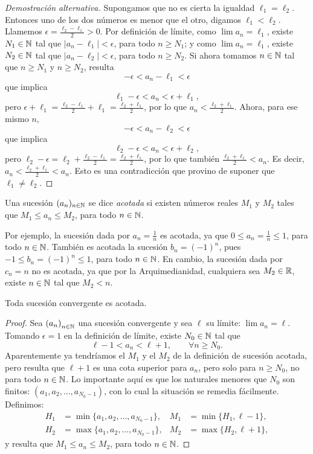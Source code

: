 \begin{proof}[Demostración alternativa]
    Supongamos que no es cierta la igualdad $\ell_1 = \ell_2$. Entonces uno de los dos números es menor que el otro, digamos $\ell_1 < \ell_2$. Llamemos $\epsilon = \frac{\ell_2-\ell_1}2 > 0$. 
    Por definición de límite, como $\lim a_n = \ell_1$, existe $N_1\in\mathbb{N}$ tal que $|a_n-\ell_1|<\epsilon$, para todo $n\ge N_1$; y como $\lim a_n = \ell_1$, existe $N_2\in\mathbb{N}$ tal que $|a_n-\ell_2|<\epsilon$, para todo $n\ge N_2$.
    Si ahora tomamos $n\in\mathbb{N}$ tal que $n\ge N_1$ y $n\ge N_2$, resulta
\[
-\epsilon < a_n -\ell_1 < \epsilon
\]
que implica 
\[
\ell_1-\epsilon < a_n < \epsilon+\ell_1,
\]
pero $\epsilon + \ell_1 = \frac{\ell_2-\ell_1}2 +\ell_1
= \frac{\ell_2+\ell_1}2 $, por lo que $a_n < \frac{\ell_2+\ell_1}2 $.
Ahora, para ese mismo $n$, 
\[
-\epsilon < a_n -\ell_2 < \epsilon
\]
que implica 
\[
    \ell_2-\epsilon < a_n < \epsilon+\ell_2,
\]
pero $\ell_2 - \epsilon =\ell_2 + \frac{\ell_2-\ell_1}2 =  \frac{\ell_2+\ell_1}2  $, por lo que también $\frac{\ell_2+\ell_1}2  < a_n$.
Es decir, $a_n < \frac{\ell_2+\ell_1}2  < a_n$. Esto es una contradicción que provino de suponer que $\ell_1 \neq \ell_2$.
\end{proof}

\begin{definition}
    Una sucesión $(a_n)_{n\in\mathbb{N}}$ se dice \emph{acotada} si existen números reales $M_1$ y $M_2$ tales que $M_1 \le a_n \le M_2$, para todo $n\in\mathbb{N}$.
\end{definition}

Por ejemplo, la sucesión dada por $a_n = \frac1n$ es acotada, ya que $0\le a_n=\frac1n \le 1$, para todo $n\in\mathbb{N}$.
También es acotada la sucesión $b_n = (-1)^n$, pues $-1 \le b_n = (-1)^n\le 1$, para todo $n\in\mathbb{N}$.
En cambio, la sucesión dada por $c_n = n$ no es acotada, ya que por la Arquimedianidad, cualquiera sea $M_2\in\mathbb{R}$, existe $n\in\mathbb{N}$ tal que $M_2 < n$.

\begin{proposition}
    Toda sucesión convergente es acotada.
\end{proposition}

\begin{proof}
Sea $\left(a_n\right)_{n\in\mathbb{N}}$ una sucesión convergente y sea $\ell$ su límite: $\lim a_n = \ell$.
Tomando $\epsilon = 1$ en la definición de límite, existe $N_0\in\mathbb{N}$ tal que 
\[
\ell-1 < a_n < \ell+1,
\qquad\forall n\ge N_0.
\]
Aparentemente ya tendríamos el $M_1$ y el $M_2$ de la definición de sucesión acotada, pero resulta que $\ell+1$ es una cota superior para $a_n$, pero solo para $n\ge N_0$, no para todo $n\in\mathbb{N}$.
Lo importante aquí es que los naturales menores que $N_0$ son finitos: $(a_1, a_2, \dots, a_{N_0-1})$, con lo cual la situación se remedia fácilmente.
Definimos:
\[
\begin{aligned}
H_1 &= \min \{ a_1, a_2, \dots, a_{N_0-1} \},
& 
M_1 &= \min \{ H_1, \ell-1\},\\
H_2 &= \max \{ a_1, a_2, \dots, a_{N_0-1} \}, 
&
M_2 &= \max \{ H_2, \ell+1\},
\end{aligned}
\]
y resulta que $M_1 \le a_n \le M_2$, para todo $n\in\mathbb{N}$.
\end{proof}

